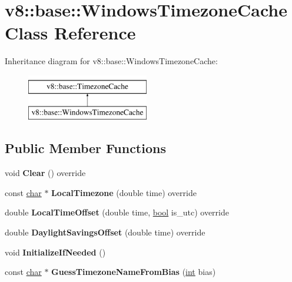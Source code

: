 \hypertarget{classv8_1_1base_1_1WindowsTimezoneCache}{}\section{v8\+:\+:base\+:\+:Windows\+Timezone\+Cache Class Reference}
\label{classv8_1_1base_1_1WindowsTimezoneCache}
Inheritance diagram for v8\+:\+:base\+:\+:Windows\+Timezone\+Cache\+:\begin{figure}[H]
\begin{center}
\leavevmode
\includegraphics[height=2.000000cm]{classv8_1_1base_1_1WindowsTimezoneCache}
\end{center}
\end{figure}
\subsection*{Public Member Functions}
\begin{DoxyCompactItemize}
\item 
\mbox{\label{classv8_1_1base_1_1WindowsTimezoneCache_a2bd5e718525eefa1a32feb5d7fdc9838}} 
void {\bfseries Clear} () override
\item 
\mbox{\label{classv8_1_1base_1_1WindowsTimezoneCache_a3e88bfe85412df6e375359f0c0f6aeb5}} 
const \mbox{\hyperlink{classchar}{char}} $\ast$ {\bfseries Local\+Timezone} (double time) override
\item 
\mbox{\label{classv8_1_1base_1_1WindowsTimezoneCache_a23549bbc5dc6d62d57026f7082326725}} 
double {\bfseries Local\+Time\+Offset} (double time, \mbox{\hyperlink{classbool}{bool}} is\+\_\+utc) override
\item 
\mbox{\label{classv8_1_1base_1_1WindowsTimezoneCache_ab249d8268dfd25d1bfd5d10dfd93ab56}} 
double {\bfseries Daylight\+Savings\+Offset} (double time) override
\item 
\mbox{\label{classv8_1_1base_1_1WindowsTimezoneCache_a491ca05ff3781f2d67d172ed846d94b3}} 
void {\bfseries Initialize\+If\+Needed} ()
\item 
\mbox{\label{classv8_1_1base_1_1WindowsTimezoneCache_accdc97bf88ced8010e18af1b4758f099}} 
const \mbox{\hyperlink{classchar}{char}} $\ast$ {\bfseries Guess\+Timezone\+Name\+From\+Bias} (\mbox{\hyperlink{classint}{int}} bias)
\end{DoxyCompactItemize}
